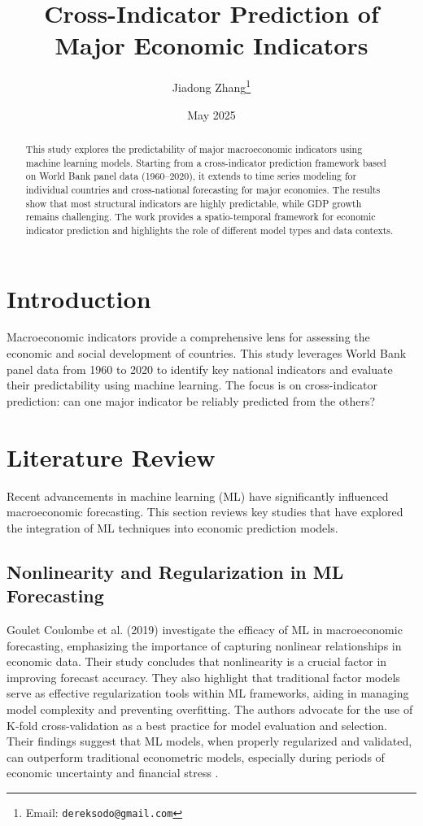 \documentclass[12pt]{article}
\title{Cross-Indicator Prediction of Major Economic Indicators}
\author{Jiadong Zhang\thanks{Email: \texttt{dereksodo@gmail.com}}}
\date{May 2025}
\begin{document}
\maketitle

\begin{abstract}
This study explores the predictability of major macroeconomic indicators using machine learning models. Starting from a cross-indicator prediction framework based on World Bank panel data (1960--2020), it extends to time series modeling for individual countries and cross-national forecasting for major economies. The results show that most structural indicators are highly predictable, while GDP growth remains challenging. The work provides a spatio-temporal framework for economic indicator prediction and highlights the role of different model types and data contexts.
\end{abstract}

\newpage
\tableofcontents
\newpage


\section{Introduction}

Macroeconomic indicators provide a comprehensive lens for assessing the economic and social development of countries. This study leverages World Bank panel data from 1960 to 2020 to identify key national indicators and evaluate their predictability using machine learning. The focus is on cross-indicator prediction: can one major indicator be reliably predicted from the others?
\section{Literature Review}

Recent advancements in machine learning (ML) have significantly influenced macroeconomic forecasting. This section reviews key studies that have explored the integration of ML techniques into economic prediction models.

\subsection{Nonlinearity and Regularization in ML Forecasting}

Goulet Coulombe et al. (2019) investigate the efficacy of ML in macroeconomic forecasting, emphasizing the importance of capturing nonlinear relationships in economic data. Their study concludes that nonlinearity is a crucial factor in improving forecast accuracy. They also highlight that traditional factor models serve as effective regularization tools within ML frameworks, aiding in managing model complexity and preventing overfitting. The authors advocate for the use of K-fold cross-validation as a best practice for model evaluation and selection. Their findings suggest that ML models, when properly regularized and validated, can outperform traditional econometric models, especially during periods of economic uncertainty and financial stress \cite{GouletCoulombe2019}.
\end{document}
